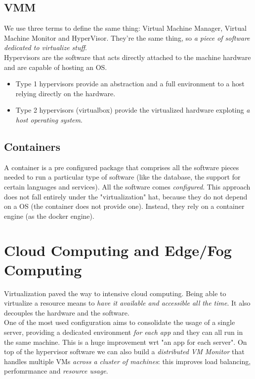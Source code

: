 \documentclass[10pt,a4paper]{article}
\begin{document}
			\subsection{VMM}
				We use three terms to define the same thing: Virtual Machine Manager, Virtual Machine Monitor and HyperVisor. They're the same thing, so \emph{a piece of software dedicated to virtualize stuff}.\\
				Hypervisors are the software that acts directly attached to the machine hardware and are capable of hosting an OS.
				\begin{itemize}
					\item Type 1 hypervisors provide an abstraction and a full environment to a host relying directly on the hardware.
					\item Type 2 hypervisors (virtualbox) provide the virtualized hardware exploting \emph{a host operating system}.
				\end{itemize}
				
			\subsection{Containers}
				A container is a pre configured package that comprises all the software pieces needed to run a particular type of software (like the database, the support for certain languages and services). All the software comes \emph{configured}. This approach does not fall entirely under the "virtualization" hat, because they do not depend on a OS (the container does not provide one). Instead, they rely on a container engine (as the docker engine).
				
		\section{Cloud Computing and Edge/Fog Computing}
			Virtualization paved the way to intensive cloud computing. Being able to virtualize a resource means to \emph{have it available and accessible all the time}. It also decouples the hardware and the software.\\
			One of the most used configuration aims to consolidate the usage of a single server, providing a dedicated environment \emph{for each app} and they can all run in the same machine. This is a huge improvement wrt "an app for each server". On top of the hypervisor software we can also build a \emph{distributed VM Monitor} that handles multiple VMs \emph{across a cluster of machines}: this improves load balancing, perfomrmance and \emph{resource usage}.\\
			
\end{document}
